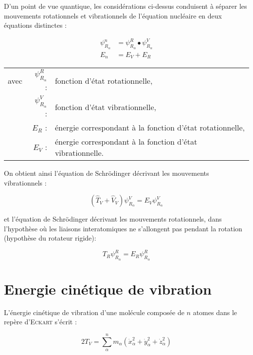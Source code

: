 \documentclass[12pt,a4paper]{book}
\begin{document}
D'un point de vue quantique, les considérations ci-dessus conduisent à séparer les mouvements rotationnels et vibrationnels de l'équation nucléaire en deux équations distinctes :

\begin{align}
\psi^n_{R_{\alpha}} &= \psi^R_{R_{\alpha}} \bullet \psi^V_{R_{\alpha}} \\
E_n &= E_V + E_R
\end{align}
\begin{flushleft}
	\begin{tabular}{@{}lrp{10cm}}
		avec & $\psi^R_{R_{\alpha}}$ : & fonction d'état rotationnelle, \\
		& $\psi^V_{R_{\alpha}}$ : & fonction d'état vibrationnelle,\\
		& $E_R$ : & énergie correspondant à la fonction d'état rotationnelle,\\
		& $E_V$ : & énergie correspondant à la fonction d'état vibrationnelle.
	\end{tabular}
\end{flushleft}

On obtient ainsi l'équation de Schr\"{o}dinger décrivant les mouvements vibrationnels :

\begin{equation}
\left(\hat{T}_V + \hat{V}_V\right) \psi^V_{R_{\alpha}} = E_V \psi^V_{R_{\alpha}}
\end{equation}

\noindent et l'équation de Schr\"{o}dinger décrivant les mouvements rotationnels, dans l'hypothèse où les liaisons interatomiques ne s'allongent pas pendant la rotation (hypothèse du rotateur rigide):

\begin{equation}
T_R \psi^R_{R_{\alpha}} = E_R \psi^R_{R_{\alpha}}
\end{equation}


\section{Energie cinétique de vibration }

L'énergie cinétique de vibration d'une molécule composée de $n$ atomes dans le repère d'\textsc{Eckart} s'écrit :

\begin{equation}
2T_V = \sum^n_{\alpha}m_{\alpha}\left( \dot{x}^2_{\alpha} + \dot{y}^2_{\alpha} + \dot{z}^2_{\alpha}\right)
\end{equation}
\end{document}
